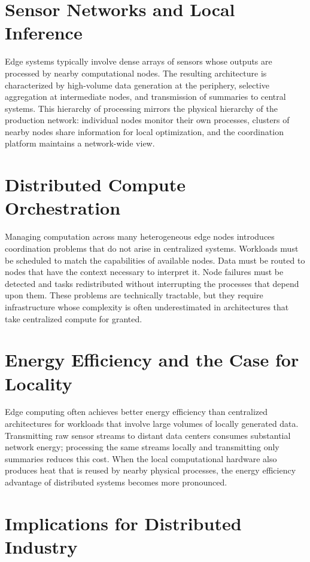 \documentclass[12pt]{book}
\theoremstyle{definition}
\theoremstyle{remark}
\begin{document}
\section{Sensor Networks and Local Inference}

Edge systems typically involve dense arrays of sensors whose outputs
are processed by nearby computational nodes. The resulting
architecture is characterized by high-volume data generation at the
periphery, selective aggregation at intermediate nodes, and
transmission of summaries to central systems. This hierarchy of
processing mirrors the physical hierarchy of the production network:
individual nodes monitor their own processes, clusters of nearby
nodes share information for local optimization, and the coordination
platform maintains a network-wide view.

\section{Distributed Compute Orchestration}

Managing computation across many heterogeneous edge nodes introduces
coordination problems that do not arise in centralized systems.
Workloads must be scheduled to match the capabilities of available
nodes. Data must be routed to nodes that have the context necessary
to interpret it. Node failures must be detected and tasks
redistributed without interrupting the processes that depend upon
them. These problems are technically tractable, but they require
infrastructure whose complexity is often underestimated in
architectures that take centralized compute for granted.

\section{Energy Efficiency and the Case for Locality}

Edge computing often achieves better energy efficiency than
centralized architectures for workloads that involve large volumes of
locally generated data. Transmitting raw sensor streams to distant
data centers consumes substantial network energy; processing the same
streams locally and transmitting only summaries reduces this cost.
When the local computational hardware also produces heat that is
reused by nearby physical processes, the energy efficiency advantage
of distributed systems becomes more pronounced.

\section{Implications for Distributed Industry}
\end{document}
